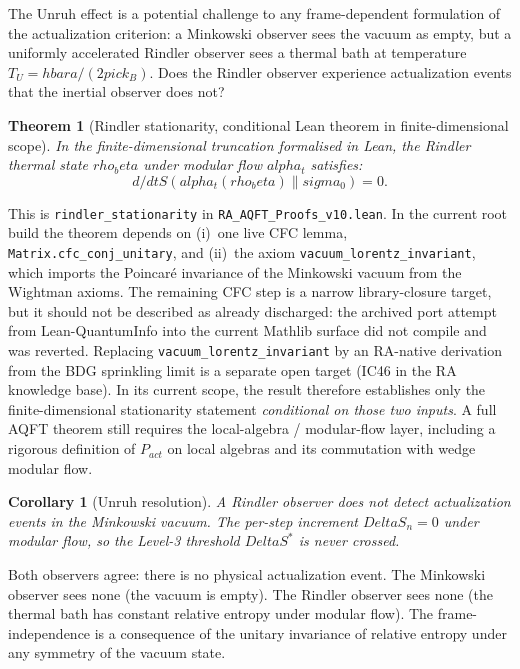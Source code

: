 \documentclass[11pt]{article}
\DeclareRobustCommand{\hbar}{\ensuremath{\hslash}}
\def\hbar{hbar}%
\def\Delta{Delta}%
\def\rho{rho}%
\def\sigma{sigma}%
\def\alpha{alpha}%
\def\beta{beta}%
\def\pi{pi}%
\def\mathrm#1{#1}%
\def\frac#1#2{#1/#2}%
\newtheorem{theorem}{Theorem}
\newtheorem{corollary}{Corollary}
\begin{document}
The Unruh effect is a potential challenge to any frame-dependent formulation of the actualization criterion: a Minkowski observer sees the vacuum as empty, but a uniformly accelerated Rindler observer sees a thermal bath at temperature $T_U = \hbar a/(2\pi c k_B)$. Does the Rindler observer experience actualization events that the inertial observer does not?

\begin{theorem}[Rindler stationarity, conditional Lean theorem in finite-dimensional scope]
\label{thm:rindler}
In the finite-dimensional truncation formalised in Lean, the Rindler thermal state $\rho_\beta$ under modular flow $\alpha_t$ satisfies:
\begin{equation}
\frac{d}{dt} S(\alpha_t(\rho_\beta) \| \sigma_0) = 0.
\end{equation}
\end{theorem}
This is \texttt{rindler\_stationarity} in \texttt{RA\_AQFT\_Proofs\_v10.lean}. In the current root build the theorem depends on (i)~one live CFC lemma, \texttt{Matrix.cfc\_conj\_unitary}, and (ii)~the axiom \texttt{vacuum\_lorentz\_invariant}, which imports the Poincar\'e invariance of the Minkowski vacuum from the Wightman axioms. The remaining CFC step is a narrow library-closure target, but it should not be described as already discharged: the archived port attempt from Lean-QuantumInfo into the current Mathlib surface did not compile and was reverted. Replacing \texttt{vacuum\_lorentz\_invariant} by an RA-native derivation from the BDG sprinkling limit is a separate open target (IC46 in the RA knowledge base). In its current scope, the result therefore establishes only the finite-dimensional stationarity statement \emph{conditional on those two inputs}. A full AQFT theorem still requires the local-algebra / modular-flow layer, including a rigorous definition of \(P_{\mathrm{act}}\) on local algebras and its commutation with wedge modular flow.

\begin{corollary}[Unruh resolution]
A Rindler observer does not detect actualization events in the Minkowski vacuum. The per-step increment $\Delta S_n = 0$ under modular flow, so the Level-3 threshold $\Delta S^*$ is never crossed.
\end{corollary}

Both observers agree: there is no physical actualization event. The Minkowski observer sees none (the vacuum is empty). The Rindler observer sees none (the thermal bath has constant relative entropy under modular flow). The frame-independence is a consequence of the unitary invariance of relative entropy under any symmetry of the vacuum state.
\end{document}
